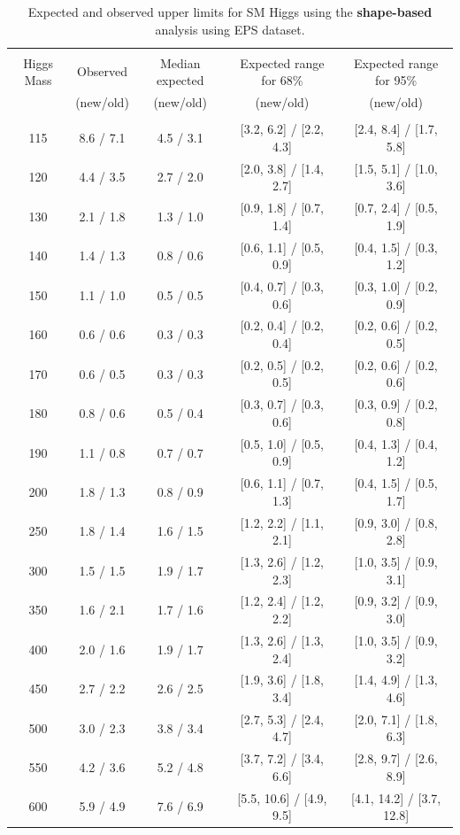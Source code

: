 \begin{table}[hbp!]
\begin{center}
\begin{tabular}{c c c c c}
\hline
\vspace{-3mm} && \\
 Higgs Mass   & Observed & Median expected & Expected range for 68\% & Expected range for 95\%   \\
  & (new/old) & (new/old) & (new/old) & (new/old)   \\
\vspace{-3mm} && \\
\hline
115 & 8.6 / 7.1 & 4.5 / 3.1 & [3.2, 6.2] / [2.2, 4.3]& [2.4, 8.4] / [1.7, 5.8] \\
120 & 4.4 / 3.5 & 2.7 / 2.0 & [2.0, 3.8] / [1.4, 2.7]& [1.5, 5.1] / [1.0, 3.6] \\
130 & 2.1 / 1.8 & 1.3 / 1.0 & [0.9, 1.8] / [0.7, 1.4]& [0.7, 2.4] / [0.5, 1.9] \\
140 & 1.4 / 1.3 & 0.8 / 0.6 & [0.6, 1.1] / [0.5, 0.9]& [0.4, 1.5] / [0.3, 1.2] \\
150 & 1.1 / 1.0 & 0.5 / 0.5 & [0.4, 0.7] / [0.3, 0.6]& [0.3, 1.0] / [0.2, 0.9] \\
160 & 0.6 / 0.6 & 0.3 / 0.3 & [0.2, 0.4] / [0.2, 0.4]& [0.2, 0.6] / [0.2, 0.5] \\
170 & 0.6 / 0.5 & 0.3 / 0.3 & [0.2, 0.5] / [0.2, 0.5]& [0.2, 0.6] / [0.2, 0.6] \\
180 & 0.8 / 0.6 & 0.5 / 0.4 & [0.3, 0.7] / [0.3, 0.6]& [0.3, 0.9] / [0.2, 0.8] \\
190 & 1.1 / 0.8 & 0.7 / 0.7 & [0.5, 1.0] / [0.5, 0.9]& [0.4, 1.3] / [0.4, 1.2] \\
200 & 1.8 / 1.3 & 0.8 / 0.9 & [0.6, 1.1] / [0.7, 1.3]& [0.4, 1.5] / [0.5, 1.7] \\
250 & 1.8 / 1.4 & 1.6 / 1.5 & [1.2, 2.2] / [1.1, 2.1]& [0.9, 3.0] / [0.8, 2.8] \\
300 & 1.5 / 1.5 & 1.9 / 1.7 & [1.3, 2.6] / [1.2, 2.3]& [1.0, 3.5] / [0.9, 3.1] \\
350 & 1.6 / 2.1 & 1.7 / 1.6 & [1.2, 2.4] / [1.2, 2.2]& [0.9, 3.2] / [0.9, 3.0] \\
400 & 2.0 / 1.6 & 1.9 / 1.7 & [1.3, 2.6] / [1.3, 2.4]& [1.0, 3.5] / [0.9, 3.2] \\
450 & 2.7 / 2.2 & 2.6 / 2.5 & [1.9, 3.6] / [1.8, 3.4]& [1.4, 4.9] / [1.3, 4.6] \\
500 & 3.0 / 2.3 & 3.8 / 3.4 & [2.7, 5.3] / [2.4, 4.7]& [2.0, 7.1] / [1.8, 6.3] \\
550 & 4.2 / 3.6 & 5.2 / 4.8 & [3.7, 7.2] / [3.4, 6.6]& [2.8, 9.7] / [2.6, 8.9] \\
600 & 5.9 / 4.9 & 7.6 / 6.9 & [5.5, 10.6] / [4.9, 9.5]& [4.1, 14.2] / [3.7, 12.8]\\

\hline
\end{tabular}
\caption{Expected and observed upper limits for SM Higgs using the
  {\bf shape-based} analysis using EPS dataset.}
\label{tab:mvabase_uls_eps}
\end{center}
\end{table}

